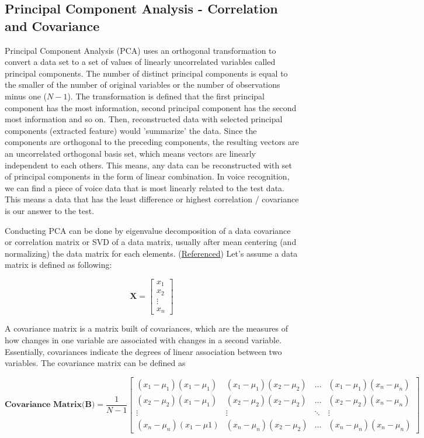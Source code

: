 \documentclass{tufte-handout}
\begin{document}
\subsection{Principal Component Analysis - Correlation and Covariance}
Principal Component Analysis (PCA) uses an orthogonal transformation to convert a data set to a set of values of linearly uncorrelated variables called principal components. The number of distinct principal components is equal to the smaller of the number of original variables or the number of observations minus one ($N-1$). The transformation is defined that the first principal component has the most information, second principal component has the second most information and so on. Then, reconstructed data with selected principal components (extracted feature) would 'summarize' the data. Since the components are orthogonal to the preceding components, the resulting vectors are an uncorrelated orthogonal basis set, which means vectors are linearly independent to each others. This means, any data can be reconstructed with set of principal components in the form of linear combination. In voice recognition, we can find a piece of voice data that is most linearly related to the test data. This means a data that has the least difference or highest correlation / covariance is our answer to the test. 

Conducting PCA can be done by eigenvalue decomposition of a data covariance or correlation matrix or SVD of a data matrix, usually after mean centering (and normalizing) the data matrix for each elements. (\href{https://en.wikipedia.org/wiki/Principal_component_analysis}{Referenced})
Let's assume a data matrix is defined as following:

\[
\textbf{X} = 
\begin{bmatrix}
    x_{1}   \\
    x_{2}   \\
    \vdots \\
    x_{n} 
\end{bmatrix}
\]

A covariance matrix is a matrix built of covariances, which are the measures of how changes in one variable are associated with changes in a second variable. Essentially, covariances indicate the degrees of linear association between two variables. The covariance matrix can be defined as

\[
\textbf{Covariance Matrix(B)}= 
\frac{1}{N-1}
\begin{bmatrix}
    (x_{1}-\mu_{1})(x_{1}-\mu_{1})  & (x_{1}-\mu_{1})(x_{2}-\mu_{2}) & \dots & (x_{1}-\mu_{1})(x_{n}-\mu_{n}) \\
    
    (x_{2}-\mu_{2})(x_{1}-\mu_{1}) & (x_{2}-\mu_{2})(x_{2}-\mu_{2}) & \dots &  (x_{2}-\mu_{2})(x_{n}-\mu_{n})\\
    
    \vdots  & \vdots & \ddots & \vdots \\
    
    (x_{n}-\mu_{n})(x_{1}-\mu{1}) & (x_{n}-\mu_{n})(x_{2}-\mu_{2}) & \dots & (x_{n}-\mu_{n})(x_{n}-\mu_{n}) 

\end{bmatrix}
\]
\end{document}

